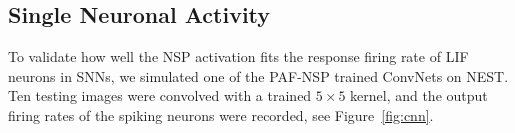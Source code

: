 	
	\subsection{Single Neuronal Activity}
	\label{subsec:compareAF}
	To validate how well the NSP activation fits the response firing rate of LIF neurons in SNNs, we simulated one of the PAF-NSP trained ConvNets on NEST.
	Ten testing images were convolved with a trained $5\times5$ kernel, and the output firing rates of the spiking neurons were recorded, see Figure~\ref{fig:cnn}.
	
